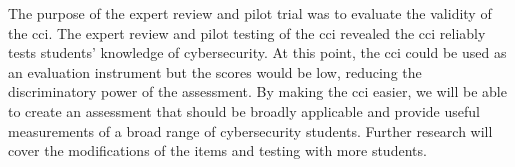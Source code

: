 
The purpose of the expert review and pilot trial was to evaluate the validity of the \gls{cci}. The expert review and pilot testing of the \gls{cci} revealed the \gls{cci} reliably tests students' knowledge of cybersecurity. At this point, the \gls{cci} could be used as an evaluation instrument but the scores would be low, reducing the discriminatory power of the assessment. By making the \gls{cci} easier, we will be able to create an assessment that should be broadly applicable and provide useful measurements of a broad range of cybersecurity students. Further research will cover the modifications of the items and testing with more students. 